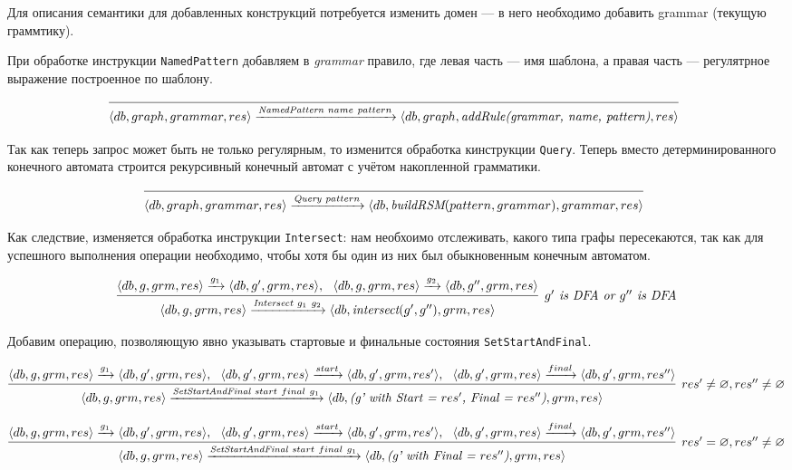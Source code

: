 Для описания семантики для добавленных конструкций потребуется изменить домен --- в него необходимо добавить grammar (текущую граммтику).


При обработке инструкции \verb|NamedPattern| добавляем в \textit{grammar} правило, где левая часть --- имя шаблона, а правая часть --- регулятрное выражение построенное по шаблону.

$$
\infer[]{\langle db, graph, grammar, res \rangle \xrightarrow{\textit{NamedPattern} \ name \ pattern} \langle db, graph, \textit{addRule(grammar, name, pattern)}, res \rangle}{}
$$

Так как теперь запрос может быть не только регулярным, то изменится обработка кинструкции \verb|Query|. Теперь вместо детерминированного конечного автомата строится рекурсивный конечный автомат с учётом накопленной грамматики.

$$
\infer[]{\langle db, graph, grammar, res \rangle \xrightarrow{\textit{Query} \ pattern} \langle db, \textit{buildRSM}(pattern, grammar), grammar, res \rangle}{}
$$

Как следствие, изменяется обработка инструкции \verb|Intersect|: нам необхоимо отслеживать, какого типа графы пересекаются, так как для успешного выполнения операции необходимо, чтобы хотя бы один из них был обыкновенным конечным автоматом. 

$$
\infer[\textit {$g'$ is DFA or $g''$ is DFA}]{\langle db, g, grm, res\rangle \xrightarrow{\textit{Intersect} \ g_1 \ g_2} \langle db, \textit{intersect}(g', g''), grm, res\rangle}{\langle db, g, grm, res\rangle \xrightarrow{g_1} \langle db, g', grm, res \rangle, \ \ \langle db, g, grm, res \rangle \xrightarrow{g_2} \langle db, g'', grm, res \rangle}
$$

Добавим операцию, позволяющую явно указывать стартовые и финальные состояния \verb|SetStartAndFinal|.

{
\scriptsize
$$
\infer[res' \neq \varnothing, res'' \neq \varnothing]{\langle db, g, grm, res\rangle \xrightarrow{\textit{SetStartAndFinal} \ start \ final \ g_1} \langle db, \textit{(g' with Start = $res'$, Final = $res''$)}, grm, res\rangle}{\langle db, g, grm, res\rangle \xrightarrow{g_1} \langle db, g', grm, res \rangle, \ \ \langle db, g', grm, res \rangle \xrightarrow{start} \langle db, g', grm, res' \rangle, \ \ \langle db, g', grm, res \rangle \xrightarrow{final} \langle db, g', grm, res'' \rangle}
$$
}

{
\scriptsize
$$
\infer[res' = \varnothing, res'' \neq \varnothing]{\langle db, g, grm, res\rangle \xrightarrow{\textit{SetStartAndFinal} \ start \ final \ g_1} \langle db, \textit{(g' with Final = $res''$)}, grm, res\rangle}{\langle db, g, grm, res\rangle \xrightarrow{g_1} \langle db, g', grm, res \rangle, \ \ \langle db, g', grm, res \rangle \xrightarrow{start} \langle db, g', grm, res' \rangle, \ \ \langle db, g', grm, res \rangle \xrightarrow{final} \langle db, g', grm, res'' \rangle}
$$
}

